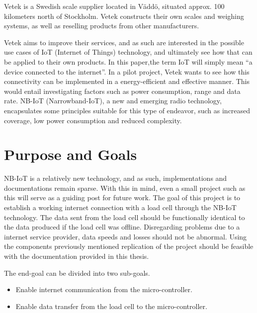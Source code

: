 Vetek is a Swedish scale supplier located in Väddö, situated approx. 100 kilometers north of Stockholm. Vetek constructs their own scales and weighing systems, as well as reselling products from other manufacturers.\cite{vetek} 

Vetek aims to improve their services, and as such are interested in the possible use cases of IoT (Internet of Things) technology, and ultimately see how that can be applied to their own products. In this paper,the term IoT will simply mean ``a device connected to the internet''\cite{what_is_iot}. In a pilot project, Vetek wants to see how this connectivity can be implemented in a energy-efficient and effective manner. This would entail investigating factors such as power consumption, range and data rate. NB-IoT (Narrowband-IoT), a new and emerging radio technology, encapsulates some principles suitable for this type of endeavor, such as increased coverage, low power consumption and reduced complexity.\cite{NB-overview}




\section{Purpose and Goals}
\iffalse
\begin{itemize}
	\item Write about the grand scheme of things
	\item Set the correct expectations
	\item What can I expect to learn if I keep on reading?
	\item What are the success criteria for this work?
	\item How will the work be evaluated?
\end{itemize}
\fi

NB-IoT is a relatively new technology, and as such, implementations and documentations remain sparse. With this in mind, even a small project such as this will serve as a guiding post for future work. The goal of this project is to establish a working internet connection with a load cell through the NB-IoT technology. The data sent from the load cell should be functionally identical to the data produced if the load cell was offline. Disregarding problems due to a internet service provider, data speeds and losses should not be abnormal. Using the components previously mentioned replication of the project should be feasible with the documentation provided in this thesis.

The end-goal can be divided into two sub-goals. 
\begin{itemize}
	\item Enable internet communication from the micro-controller.
	\item Enable data transfer from the load cell to the micro-controller.
\end{itemize}


